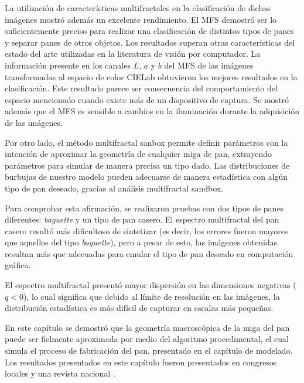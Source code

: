 La utilización de características multifractales en la clasificación de dichas imágenes mostró además un excelente rendimiento.
El MFS demostró ser lo suficientemente preciso para realizar una clasificación de distintos tipos de panes y separar panes de otros objetos.
Los resultados superan otras características del estado del arte utilizadas en la literatura de visión por computador.
La información presente en los canales $L$, $a$ y $b$ del MFS de las imágenes transformadas al espacio de color CIELab obtuvieron los mejores resultados en la clasificación.
Este resultado parece ser consecuencia del comportamiento del espacio mencionado cuando existe más de un dispositivo de captura.
Se mostró además que el MFS es sensible a cambios en la iluminación durante la adquisición de las imágenes.

Por otro lado, el método multifractal sanbox permite definir parámetros con la intención de aproximar la geometría de cualquier miga de pan, extrayendo parámetros para simular de manera precisa un tipo dado.
Las distribuciones de burbujas de nuestro modelo pueden adecuarse de manera estadística con algún tipo de pan deseado, gracias al análisis multifractal sandbox.

Para comprobar esta afirmación, se realizaron pruebas con dos tipos de panes diferentes: {\em baguette} y un tipo de pan casero.
El espectro multifractal del pan casero resultó más dificultoso de sintetizar (es decir, los errores fueron mayores que aquellos del tipo {\em baguette}), pero a pesar de esto, las imágenes obtenidas resultan más que adecuadas para emular el tipo de pan deseado en computación gráfica.

El espectro multifractal presentó mayor dispersión en las dimensiones negativas ($q < 0$), 
lo cual significa que debido al límite de resolución en las imágenes, la distribución estadística es más difícil de capturar en escalas más pequeñas.

En este capítulo se demostró que la geometría macroscópica de la miga del pan puede ser fielmente aproximada por medio del algoritmo procedimental, el cual simula el proceso de fabricación del pan, presentado en el capítulo de modelado.
Los resultados presentados en este capítulo fueron presentados en congresos locales y una revista nacional \cite{Baravalle2012, Baravalle2012_2, Baravalle2012_3}.




